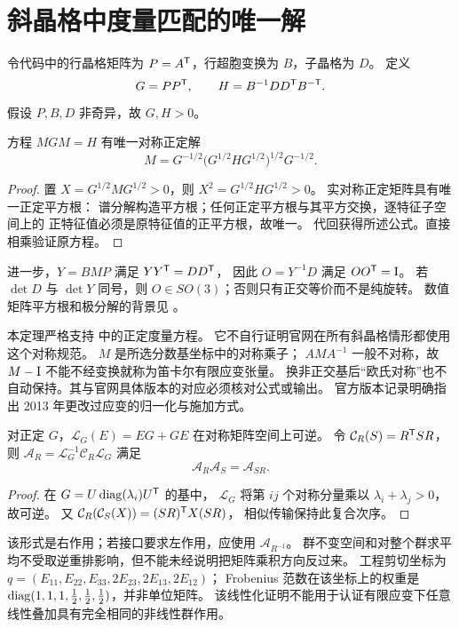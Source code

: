 \section{斜晶格中度量匹配的唯一解}\label{sec:strain}
令代码中的行晶格矩阵为 $P=A^\mathsf T$，行超胞变换为 $B$，子晶格为 $D$。
定义
\[
 G=PP^\mathsf T,\qquad H=B^{-1}DD^\mathsf T B^{-\mathsf T}.
\]
假设 $P,B,D$ 非奇异，故 $G,H>0$。
\begin{theorem}[对称正定乘子的唯一性]\label{thm:spd}
方程 $MGM=H$ 有唯一对称正定解
\[
 M=G^{-1/2}\bigl(G^{1/2}HG^{1/2}\bigr)^{1/2}G^{-1/2}.
\]
\end{theorem}
\begin{proof}
置 $X=G^{1/2}MG^{1/2}>0$，则 $X^2=G^{1/2}HG^{1/2}>0$。
实对称正定矩阵具有唯一正定平方根：
谱分解构造平方根；任何正定平方根与其平方交换，逐特征子空间上的
正特征值必须是原特征值的正平方根，故唯一。
代回获得所述公式。直接相乘验证原方程。
\end{proof}
进一步，$Y=BMP$ 满足 $YY^\mathsf T=DD^\mathsf T$，
因此 $O=Y^{-1}D$ 满足 $OO^\mathsf T=\mathrm I$。
若 $\det D$ 与 $\det Y$ 同号，则 $O\in SO(3)$；否则只有正交等价而不是纯旋转。
数值矩阵平方根和极分解的背景见 \citet{Higham1986}。

\begin{remark}[已证明的内容与尚未证明的官网对应]
本定理严格支持  中的正定度量方程。
它不自行证明官网在所有斜晶格情形都使用这个对称规范。
$M$ 是所选分数基坐标中的对称乘子；
$AMA^{-1}$ 一般不对称，故 $M-\mathrm I$ 不能不经变换就称为笛卡尔有限应变张量。
换非正交基后“欧氏对称”也不自动保持。其与官网具体版本的对应必须核对公式或输出。
官方版本记录明确指出 2013 年更改过应变的归一化与施加方式\citep{OfficialVersions}。
\end{remark}

\begin{theorem}[线性化的可逆性与右作用]\label{thm:right}
对正定 $G$，$\mathcal L_G(E)=EG+GE$ 在对称矩阵空间上可逆。
令 $\mathcal C_R(S)=R^\mathsf T SR$，
则 $\mathcal A_R=\mathcal L_G^{-1}\mathcal C_R\mathcal L_G$ 满足
\[
 \mathcal A_R\mathcal A_S=\mathcal A_{SR}.
\]
\end{theorem}
\begin{proof}
在 $G=U\operatorname{diag}(\lambda_i)U^\mathsf T$ 的基中，
$\mathcal L_G$ 将第 $ij$ 个对称分量乘以 $\lambda_i+\lambda_j>0$，故可逆。
又 $\mathcal C_R(\mathcal C_S(X))=(SR)^\mathsf T X(SR)$，
相似传输保持此复合次序。
\end{proof}
该形式是右作用；若接口要求左作用，应使用 $\mathcal A_{R^{-1}}$。
群不变空间和对整个群求平均不受取逆重排影响，但不能未经说明把矩阵乘积方向反过来。
工程剪切坐标为
$q=(E_{11},E_{22},E_{33},2E_{23},2E_{13},2E_{12})$；
Frobenius 范数在该坐标上的权重是
$\operatorname{diag}(1,1,1,\tfrac12,\tfrac12,\tfrac12)$，并非单位矩阵。
该线性化证明不能用于认证有限应变下任意线性叠加具有完全相同的非线性群作用。

